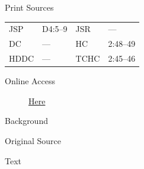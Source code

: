 			\begin{description}
					\item[Print Sources]
				\end{description}

					\begin{tabular}{p{0.5in}p{1in}p{0.5in}p{1in}}
					JSP	 	& D4:5--9		& JSR 		& --- \\
					DC	 	& --- 		& HC 		& 2:48--49 \\
					HDDC 	& ---		& TCHC 		& 2:45--46 \\
					\end{tabular}
				
				\begin{description}
					\item[Online Access] \href{https://www.josephsmithpapers.org/paper-summary/letter-to-orson-hyde-7-april-1834/1}{Here}
				\end{description}
				
				\begin{description}
					\item[Background]
				\end{description}
				
				
				\begin{description}
					\item[Original Source]
				\end{description}
				
				
				\begin{description}
					\item[Text]
				\end{description}
				
